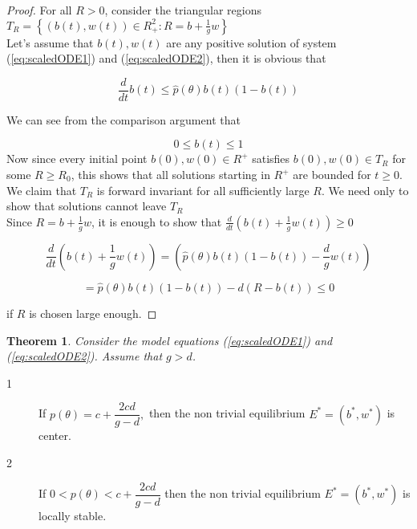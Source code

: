 \documentclass[review]{elsarticle}
\newtheorem{theorem}{Theorem}[section]
\begin{document}
\begin{proof}
For all $R>0$, consider the triangular regions $T_{R}=\left\{ \left(b(t),w(t)\right) \in R_{+}^{2}:R=b+\frac{1}{g}w\right\} $\\
Let's assume that $b(t),w(t)$ are any positive solution of system (\ref{eq:scaledODE1}) and (\ref{eq:scaledODE2}),
then it is obvious that

$$\frac{d}{dt}b(t)\leq \hat{p}\left( \theta \right) b(t)\left( 1-b(t)\right) $$

We can see from the comparison argument that

$$0\leq b(t)\leq 1$$
Now since every initial point $b(0),w(0)\in R^{+}$ satisfies $b(0),w(0)\in T_{R}$ for some $R\geq R_{0}$, this shows that all solutions starting in $R^{+}$ are bounded for $t\geq 0$.\\
We claim that $T_{R}$ is forward invariant for all sufficiently large $R.$ We
need only to show that solutions cannot leave $T_{R}$\\
Since $R=b+\frac{1}{g}w $, 
it is enough to show that $\frac{d}{dt}\left( b(t)+\frac{1}{g}w(t)\right)\geq 0$

$$\frac{d}{dt}\left( b(t)+\frac{1}{g}w(t)\right)
=\left( \hat{p}\left( \theta \right) b(t)\left( 1-b(t)\right) -\frac{d}{g}%
w\left( t\right) \right) $$

$$ =\hat{p}\left( \theta \right) b(t)\left(
1-b(t)\right) -d\left( R-b(t)\right) \leq 0$$

if $R$ is chosen large enough.
\end{proof}

\begin{theorem}
   Consider the model equations (\ref{eq:scaledODE1}) and
  (\ref{eq:scaledODE2}). Assume that  $g>d$.
 
\end{theorem}

\begin{description}
\item[1]  If $%
p(\theta )=c+\dfrac{2cd}{g-d},$ then the non trivial equilibrium $%
E^{\ast }=(b^{\ast },w^{\ast })$ is center.

\item[2] If $0<p(\theta )<c+\dfrac{2cd}{g-d}$ then the non trivial
equilibrium $E^{\ast }=(b^{\ast },w^{\ast })$ is locally stable.
\end{description}
\end{document}
